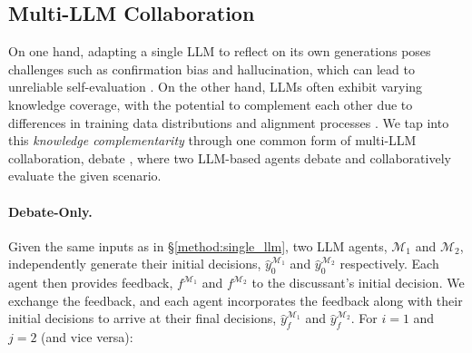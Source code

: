 

\subsection{Multi-LLM Collaboration}
\label{method:multi_llm}
On one hand, adapting a single LLM to reflect on its own generations poses challenges such as confirmation bias and hallucination, which can lead to unreliable self-evaluation \cite{feng-etal-2024-dont, liang-etal-2024-encouraging}. On the other hand, LLMs often exhibit varying knowledge coverage, with the potential to complement each other due to differences in training data distributions and alignment processes \cite{yu2023kola, du2023improving, bansal2024llm}. We tap into this \textit{knowledge complementarity} through one common form of multi-LLM collaboration, debate \cite{irving2018ai}, where two LLM-based agents debate and collaboratively evaluate the given scenario.


\paragraph{Debate-Only.}
Given the same inputs as in \S \ref{method:single_llm}, two LLM agents, $\mathcal{M}_1$ and $\mathcal{M}_2$, independently generate their initial decisions, $\hat{y}_0^{\mathcal{M}_1}$ and $\hat{y}_0^{\mathcal{M}_2}$ respectively. Each agent then provides feedback, $f^{\mathcal{M}_1}$ and $f^{\mathcal{M}_2}$ to the discussant's initial decision. We exchange the feedback, and each agent incorporates the feedback along with their initial decisions to arrive at their final decisions, $\hat{y}_f^{\mathcal{M}_1}$ and $\hat{y}_f^{\mathcal{M}_2}$. For $i=1$ and $j=2$ (and vice versa):

